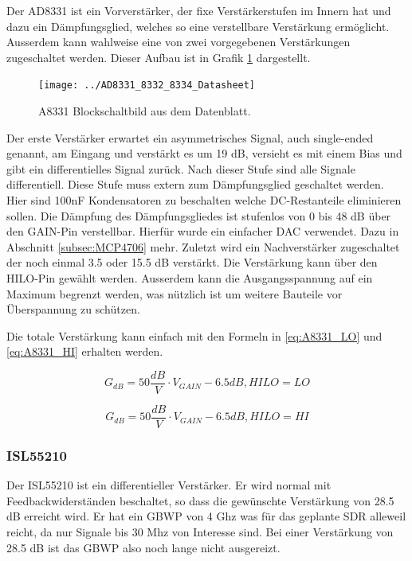 Der AD8331\cite{AD8331} ist ein Vorverstärker, der fixe Verstärkerstufen im Innern hat und dazu ein Dämpfungsglied, welches so eine verstellbare Verstärkung ermöglicht. Ausserdem kann wahlweise eine von zwei vorgegebenen Verstärkungen zugeschaltet werden. Dieser Aufbau ist in Grafik \ref{fig:AD8331} dargestellt.

\begin{figure}[H]
\begin{center}
    \texttt{[image: ../AD8331\_8332\_8334\_Datasheet]}
    \caption{A8331 Blockschaltbild aus dem Datenblatt\cite{AD8331}.}
    \label{fig:AD8331}
\end{center}
\end{figure}

Der erste Verstärker erwartet ein asymmetrisches Signal, auch single-ended genannt, am Eingang und verstärkt es um 19 dB, versieht es mit einem Bias und gibt ein differentielles Signal zurück. Nach dieser Stufe sind alle Signale differentiell.
Diese Stufe muss extern zum Dämpfungsglied geschaltet werden. Hier sind 100nF Kondensatoren zu beschalten welche DC-Restanteile eliminieren sollen.
Die Dämpfung des Dämpfungsgliedes ist stufenlos von 0 bis 48 dB über den GAIN-Pin verstellbar. Hierfür wurde ein einfacher DAC verwendet. Dazu in Abschnitt \ref{subsec:MCP4706} mehr.
Zuletzt wird ein Nachverstärker zugeschaltet der noch einmal 3.5 oder 15.5 dB verstärkt. Die Verstärkung kann über den HILO-Pin gewählt werden.
Ausserdem kann die Ausgangsspannung auf ein Maximum begrenzt werden, was nützlich ist um weitere Bauteile vor Überspannung zu schützen.

Die totale Verstärkung kann einfach mit den Formeln\cite{AD8331} in \ref{eq:A8331_LO} und \ref{eq:A8331_HI} erhalten werden.

\begin{equation}
    G_{dB} = 50 \frac{dB}{V} \cdot V_{GAIN} - 6.5 dB, HILO = LO
\label{eq:A8331_LO}
\end{equation}

\begin{equation}
    G_{dB} = 50 \frac{dB}{V} \cdot V_{GAIN} - 6.5 dB, HILO = HI
\label{eq:A8331_HI}
\end{equation}

\subsubsection{ISL55210}
Der ISL55210\cite{ISL55210} ist ein differentieller Verstärker. Er wird normal mit Feedbackwiderständen beschaltet\cite{ImpedanceMatching2009}, so dass die gewünschte Verstärkung von 28.5 dB erreicht wird.
Er hat ein GBWP von 4 Ghz was für das geplante SDR alleweil reicht, da nur Signale bis 30 Mhz von Interesse sind. Bei einer Verstärkung von 28.5 dB ist das GBWP also noch lange nicht ausgereizt.

